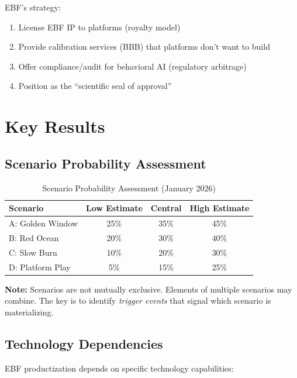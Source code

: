 EBF's strategy:
\begin{enumerate}
\item License EBF IP to platforms (royalty model)
\item Provide calibration services (BBB) that platforms don't want to build
\item Offer compliance/audit for behavioral AI (regulatory arbitrage)
\item Position as the ``scientific seal of approval''
\end{enumerate}


\section{Key Results}
\label{sec:vvv1-results}

\subsection{Scenario Probability Assessment}

\begin{table}[htbp]
\centering
\caption{Scenario Probability Assessment (January 2026)}
\label{tab:vvv-probability}
\renewcommand{\arraystretch}{1.3}
\begin{tabular}{@{}lccc@{}}
\toprule
\textbf{Scenario} & \textbf{Low Estimate} & \textbf{Central} & \textbf{High Estimate} \\
\midrule
A: Golden Window & 25\% & 35\% & 45\% \\
B: Red Ocean & 20\% & 30\% & 40\% \\
C: Slow Burn & 10\% & 20\% & 30\% \\
D: Platform Play & 5\% & 15\% & 25\% \\
\bottomrule
\end{tabular}
\end{table}

\textbf{Note:} Scenarios are not mutually exclusive. Elements of multiple scenarios may combine. The key is to identify \textit{trigger events} that signal which scenario is materializing.


\subsection{Technology Dependencies}

EBF productization depends on specific technology capabilities:

